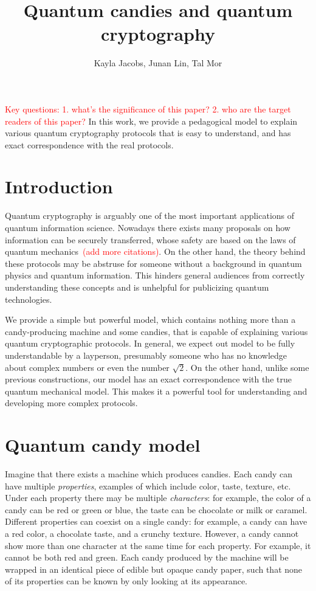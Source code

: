 \documentclass{article}
\def \todo #1{\textcolor{red}{#1}}
\begin{document}
\title{Quantum candies and quantum cryptography}
\author{Kayla Jacobs, Junan Lin, Tal Mor}
\date{}

\maketitle


\todo{Key questions: 1. what's the significance of this paper? 2. who are the target readers of this paper?}
In this work, we provide a pedagogical model to explain various quantum cryptography protocols that is easy to understand, and has exact correspondence with the real protocols.




\section{Introduction}
Quantum cryptography is arguably one of the most important applications of quantum information science.
Nowadays there exists many proposals on how information can be securely transferred, whose safety are based on the laws of quantum mechanics~\cite{bennett1984quantum}\todo{(add more citations)}.
On the other hand, the theory behind these protocols may be abstruse for someone without a background in quantum physics and quantum information.
This hinders general audiences from correctly understanding these concepts and is unhelpful for publicizing quantum technologies.

We provide a simple but powerful model, which contains nothing more than a candy-producing machine and some candies, that is capable of explaining various quantum cryptographic protocols.
In general, we expect out model to be fully understandable by a layperson, presumably someone who has no knowledge about complex numbers or even the number $\sqrt{2}$.
On the other hand, unlike some previous constructions, our model has an exact correspondence with the true quantum mechanical model.
This makes it a powerful tool for understanding and developing more complex protocols.

\section{Quantum candy model}
Imagine that there exists a machine which produces candies.
Each candy can have multiple \textit{properties}, examples of which include color, taste, texture, etc.
Under each property there may be multiple \textit{characters}: for example, the color of a candy can be red or green or blue, the taste can be chocolate or milk or caramel.
Different properties can coexist on a single candy: for example, a candy can have a red color, a chocolate taste, and a crunchy texture.
However, a candy cannot show more than one character at the same time for each property.
For example, it cannot be both red and green.
Each candy produced by the machine will be wrapped in an identical piece of edible but opaque candy paper, such that none of its properties can be known by only looking at its appearance.
\end{document}
